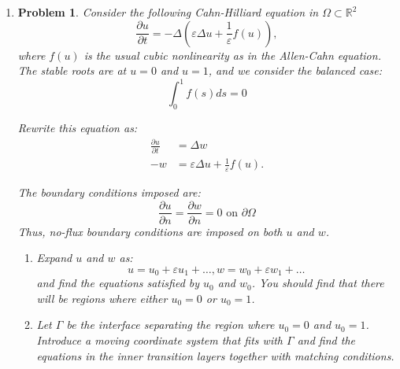 \documentclass[a4paper]{article}
\newtheorem*{problem}{Problem}
\newcommand{\R}{\mathbb{R}}
\begin{document}
\begin{enumerate}
  \item
    \begin{problem}
      Consider the following Cahn-Hilliard equation in $\Omega \subset \R^2$
      \begin{equation}
        \frac{\partial u}{\partial t} = - \Delta \left( \varepsilon \Delta u + \frac{1}{\varepsilon} f(u) \right),
        \label{eqn:prob3_1}
      \end{equation}
      where $f(u)$ is the usual cubic nonlinearity as in the Allen-Cahn equation. The stable roots are at $u=0$ and $u=1$, and we consider the
      balanced case:
      \begin{equation}
        \int_{0}^{1} f(s) ds = 0
        \label{eqn:prob3_2}
      \end{equation}

      Rewrite this equation as:
      \begin{align}
        \frac{\partial u}{\partial t} &= \Delta w \label{eqn:prob3_3} \\
        -w &= \varepsilon \Delta u + \frac{1}{\varepsilon} f(u).
        \label{eqn:prob3_4}
      \end{align}

      The boundary conditions imposed are:
      \begin{equation}
        \frac{\partial u}{\partial n} = \frac{\partial w}{\partial n} = 0 \text{ on } \partial \Omega
        \label{eqn:prob3_5}
      \end{equation}
      Thus, no-flux boundary conditions are imposed on both $u$ and $w$.

      \begin{enumerate}
        \item Expand $u$ and $w$ as:
          \begin{equation}
            u = u_0 + \varepsilon u_1 + \dots, w = w_0 + \varepsilon w_1 + \dots
            \label{eqn:prob3_6}
          \end{equation}
          and find the equations satisfied by $u_0$ and $w_0$. You should find that there will be regions where either $u_0 = 0$ or $u_0 = 1$.

        \item
          Let $\Gamma$ be the interface separating the region where $u_0 = 0$ and $u_0 = 1$. Introduce a moving coordinate system that fits with
          $\Gamma$ and find the equations in the inner transition layers together with matching conditions.


\end{enumerate}
\end{problem}
\end{enumerate}
\end{document}
